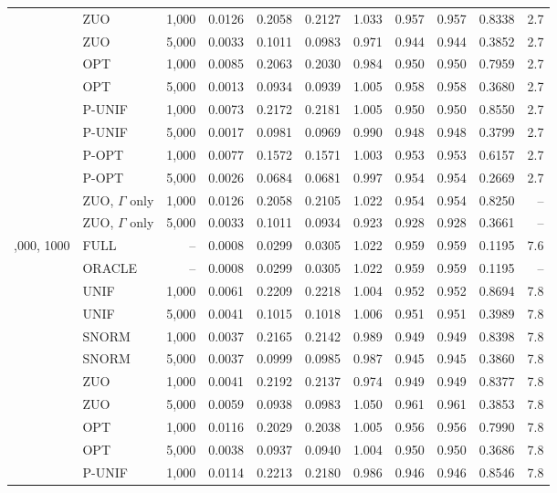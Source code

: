 \begin{tabular}{llrrrrrrrrr}
 & ZUO & 1,000 & 0.0126 & 0.2058 & 0.2127 & 1.033 & 0.957 & 0.957 & 0.8338 & 2.7\\
 & ZUO & 5,000 & 0.0033 & 0.1011 & 0.0983 & 0.971 & 0.944 & 0.944 & 0.3852 & 2.7\\
 & OPT & 1,000 & 0.0085 & 0.2063 & 0.2030 & 0.984 & 0.950 & 0.950 & 0.7959 & 2.7\\
 & OPT & 5,000 & 0.0013 & 0.0934 & 0.0939 & 1.005 & 0.958 & 0.958 & 0.3680 & 2.7\\
 & P-UNIF & 1,000 & 0.0073 & 0.2172 & 0.2181 & 1.005 & 0.950 & 0.950 & 0.8550 & 2.7\\
 & P-UNIF & 5,000 & 0.0017 & 0.0981 & 0.0969 & 0.990 & 0.948 & 0.948 & 0.3799 & 2.7\\
 & P-OPT & 1,000 & 0.0077 & 0.1572 & 0.1571 & 1.003 & 0.953 & 0.953 & 0.6157 & 2.7\\
 & P-OPT & 5,000 & 0.0026 & 0.0684 & 0.0681 & 0.997 & 0.954 & 0.954 & 0.2669 & 2.7\\
 & ZUO, \(\Gamma\) only & 1,000 & 0.0126 & 0.2058 & 0.2105 & 1.022 & 0.954 & 0.954 & 0.8250 & --\\
 & ZUO, \(\Gamma\) only & 5,000 & 0.0033 & 0.1011 & 0.0934 & 0.923 & 0.928 & 0.928 & 0.3661 & --\\
\addlinespace
100,000, 1000 & FULL & -- & 0.0008 & 0.0299 & 0.0305 & 1.022 & 0.959 & 0.959 & 0.1195 & 7.6\\
 & ORACLE & -- & 0.0008 & 0.0299 & 0.0305 & 1.022 & 0.959 & 0.959 & 0.1195 & --\\
 & UNIF & 1,000 & 0.0061 & 0.2209 & 0.2218 & 1.004 & 0.952 & 0.952 & 0.8694 & 7.8\\
 & UNIF & 5,000 & 0.0041 & 0.1015 & 0.1018 & 1.006 & 0.951 & 0.951 & 0.3989 & 7.8\\
 & SNORM & 1,000 & 0.0037 & 0.2165 & 0.2142 & 0.989 & 0.949 & 0.949 & 0.8398 & 7.8\\
 & SNORM & 5,000 & 0.0037 & 0.0999 & 0.0985 & 0.987 & 0.945 & 0.945 & 0.3860 & 7.8\\
 & ZUO & 1,000 & 0.0041 & 0.2192 & 0.2137 & 0.974 & 0.949 & 0.949 & 0.8377 & 7.8\\
 & ZUO & 5,000 & 0.0059 & 0.0938 & 0.0983 & 1.050 & 0.961 & 0.961 & 0.3853 & 7.8\\
 & OPT & 1,000 & 0.0116 & 0.2029 & 0.2038 & 1.005 & 0.956 & 0.956 & 0.7990 & 7.8\\
 & OPT & 5,000 & 0.0038 & 0.0937 & 0.0940 & 1.004 & 0.950 & 0.950 & 0.3686 & 7.8\\
 & P-UNIF & 1,000 & 0.0114 & 0.2213 & 0.2180 & 0.986 & 0.946 & 0.946 & 0.8546 & 7.8\\

\end{tabular}
